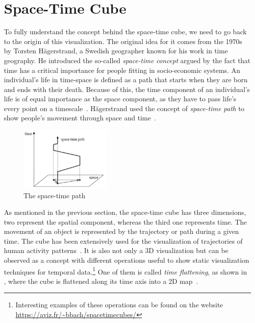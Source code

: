 \section{Space-Time Cube}\label{sec:space-time-cube}

To fully understand the concept behind the space-time cube, we need to go back to the origin of this visualization.
The original idea for it comes from the 1970s by Torsten Hägerstrand, a Swedish geographer known for his work in time geography.
He introduced the so-called \emph{space-time concept} argued by the fact that time has a critical importance for people fitting
in socio-economic systems. An individual’s life in time-space is defined as a path that starts
when they are born and ends with their death. Because of this, the time component of an individual’s life is of equal
importance as the space component, as they have to pass life’s every point on a timescale~\citep{hagerstrand_1970}.
Hägerstrand used the concept of \emph{space-time path} to show people’s movement through space and time~\citep{corbett2001torsten}.

\begin{figure}[hbt!]
    \begin{center}
        \includegraphics[width=0.4\textwidth]{graphics/2-literature-review/11}
    \end{center}
    \caption{The space-time path~\citep{buard2011visual}}
    \label{fig:figure2.8}
\end{figure}

As mentioned in the previous section, the space-time cube has three dimensions, two represent the spatial component, whereas the
third one represents time. The movement of an object is represented by the trajectory or path during a given time. The cube has
been extensively used for the visualization of trajectories of human activity patterns~\citep{demvsar2010space}. It is also not only a
3D visualization but can be observed as a concept with different operations useful to show static
visualization techniques for temporal data.\footnote{Interesting examples of these operations can be found on the website\\ \url{https://aviz.fr/~bbach/spacetimecubes/}}
One of them is called \emph{time flattening}, as shown in ,
where the cube is flattened along its time axis into a 2D map~\citep{bach2014review}.

